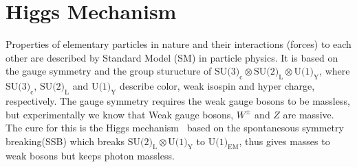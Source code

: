 \section{Higgs Mechanism}

Properties of elementary particles in nature and their interactions (forces)
to each other are described by Standard Model (SM) in particle physics. It is 
based on the gauge symmetry and the group sturucture of 
$\textrm{SU(3)}_\textrm{c} \otimes \textrm{SU(2)}_\textrm{L} 
\otimes \textrm{U(1)}_\textrm{Y}$, where  $\textrm{SU(3)}_\textrm{c}$, 
$\textrm{SU(2)}_\textrm{L}$ and $\textrm{U(1)}_\textrm{Y}$  
describe color, weak isospin and hyper charge, respectively. 
The gauge symmetry requires the weak gauge bosons to be massless,
but experimentally we know that Weak gauge bosons, $W^\pm$ and $Z$ are massive. 
The cure for this is the Higgs mechanism~\cite{}
based on the spontanesous symmetry breaking(SSB)
which breaks $\textrm{SU(2)}_\textrm{L} \otimes \textrm{U(1)}_\textrm{Y}$
to $\textrm{U(1)}_{\textrm{EM}}$, thus gives masses to weak bosons but keeps photon massless. 

